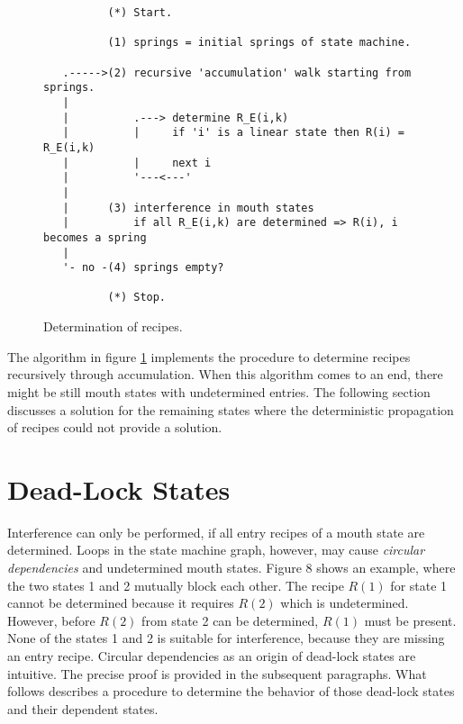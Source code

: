 \documentclass[12pt,a4paper]{scrartcl}
\begin{document}
\begin{figure}[htbp] \leavevmode \label{fig:algo-1}
\begin{verbatim}
          (*) Start.
   
          (1) springs = initial springs of state machine.

   .----->(2) recursive 'accumulation' walk starting from springs.
   |
   |          .---> determine R_E(i,k) 
   |          |     if 'i' is a linear state then R(i) = R_E(i,k)
   |          |     next i
   |          '---<---'
   |
   |      (3) interference in mouth states 
   |          if all R_E(i,k) are determined => R(i), i becomes a spring
   |
   '- no -(4) springs empty?

          (*) Stop.
\end{verbatim}

\caption{Determination of recipes.}
\end{figure}

The algorithm in figure \ref{fig:algo-1} implements the procedure to determine
recipes recursively through accumulation.  When this algorithm comes to an end,
there might be still mouth states with undetermined entries.  The following
section discusses a solution for the remaining states where the deterministic
propagation of recipes could not provide a solution.



%
\section{Dead-Lock States}

Interference can only be performed, if all entry recipes of a mouth state are
determined. Loops in the state machine graph, however, may cause
\textit{circular dependencies} and undetermined mouth states.  Figure 8 shows
an example, where the two states 1 and 2 mutually block each other. The recipe
$R(1)$ for state 1 cannot be determined because it requires $R(2)$ which is
undetermined. However, before $R(2)$ from state 2 can be determined, $R(1)$
must be present. None of the states 1 and 2 is suitable for interference,
because they are missing an entry recipe.  Circular dependencies as an origin
of dead-lock states are intuitive. The precise proof is provided in the
subsequent paragraphs. What follows describes a procedure to determine the
behavior of those dead-lock states and their dependent states.
\end{document}
